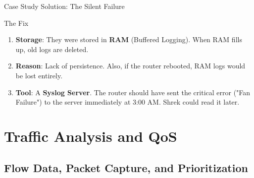 \documentclass[aspectratio=169]{beamer}  %
\begin{document}
\begin{frame}{Case Study Solution: The Silent Failure}
    \begin{exampleblock}{The Fix}
        \footnotesize
        \begin{enumerate}
            \item \textbf{Storage}: They were stored in \textbf{RAM} (Buffered Logging). When RAM fills up, old logs are deleted.
            \item \textbf{Reason}: Lack of persistence. Also, if the router rebooted, RAM logs would be lost entirely.
            \item \textbf{Tool}: A \textbf{Syslog Server}. The router should have sent the critical error ("Fan Failure") to the server immediately at 3:00 AM. Shrek could read it later.
        \end{enumerate}
    \end{exampleblock}
    \begin{center}
    \end{center}
\end{frame}

\section{Traffic Analysis and QoS}
\subsection{Flow Data, Packet Capture, and Prioritization}

\end{document}
